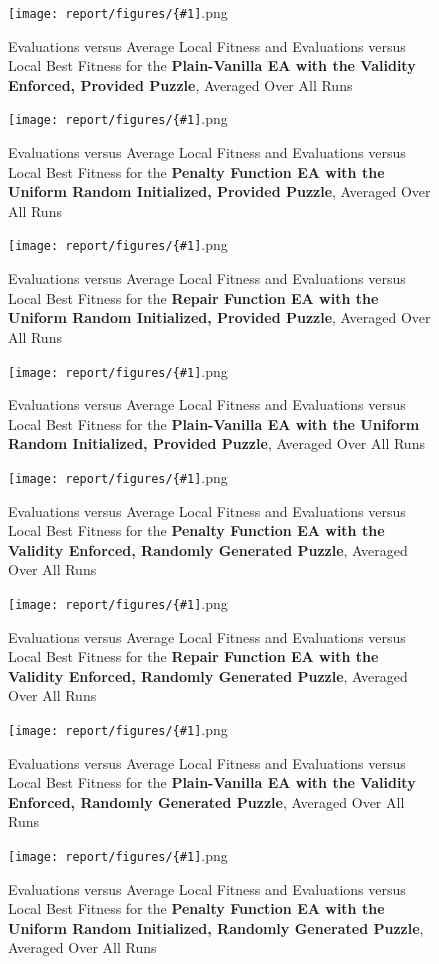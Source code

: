 \documentclass[11pt]{article}
\newcommand{\fitnessplotcaption}[1]{\caption{Evaluations versus Average Local Fitness and Evaluations versus 
    Local Best Fitness for the \textbf{{#1}}, Averaged Over All Runs}}
\newcommand{\addgraphic}[1]{\centerline{\texttt{[image: report/figures/\{\#1]}.png}}}
\begin{document}
\begin{figure}
    \addgraphic{website_puzzle_validity_enforced_vanilla_graph}
    \fitnessplotcaption{Plain-Vanilla EA with the Validity Enforced, Provided Puzzle}
    \label{fig:website_puzzle_validity_enforced_vanilla_graph}
\end{figure}

\begin{figure}
    \addgraphic{website_puzzle_uniform_random_graph}
    \fitnessplotcaption{Penalty Function EA with the Uniform Random Initialized, Provided Puzzle}
    \label{fig:website_puzzle_uniform_random_graph}
\end{figure}

\begin{figure}
    \addgraphic{website_puzzle_uniform_random_bonus_graph}
    \fitnessplotcaption{Repair Function EA with the Uniform Random Initialized, Provided Puzzle}
    \label{fig:website_puzzle_uniform_random_bonus_graph}
\end{figure}

\begin{figure}
    \addgraphic{website_puzzle_uniform_random_vanilla_graph}
    \fitnessplotcaption{Plain-Vanilla EA with the Uniform Random Initialized, Provided Puzzle}
    \label{fig:website_puzzle_uniform_random_vanilla_graph}
\end{figure}

\begin{figure}
    \addgraphic{random_gen_validity_enforced_graph}
    \fitnessplotcaption{Penalty Function EA with the Validity Enforced, Randomly Generated Puzzle}
    \label{fig:random_gen_validity_enforced_graph}
\end{figure}

\begin{figure}
    \addgraphic{random_gen_validity_enforced_bonus_graph}
    \fitnessplotcaption{Repair Function EA with the Validity Enforced, Randomly Generated Puzzle}
    \label{fig:random_gen_validity_enforced_bonus_graph}
\end{figure}

\begin{figure}
    \addgraphic{random_gen_validity_enforced_vanilla_graph}
    \fitnessplotcaption{Plain-Vanilla EA with the Validity Enforced, Randomly Generated Puzzle}
    \label{fig:random_gen_validity_enforced_vanilla_graph}
\end{figure}

\begin{figure}
    \addgraphic{random_gen_uniform_random_graph}
    \fitnessplotcaption{Penalty Function EA with the Uniform Random Initialized, Randomly Generated Puzzle}
    \label{fig:random_gen_uniform_random_graph}
\end{figure}
\end{document}
